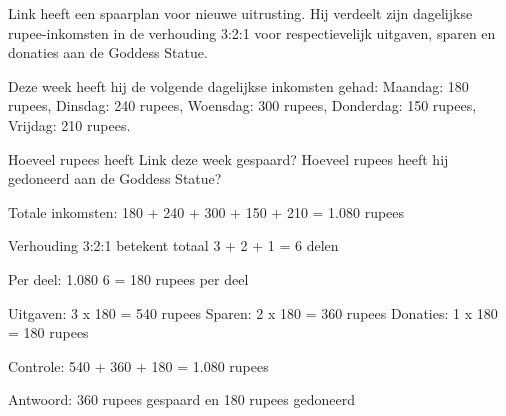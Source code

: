 \begin{opgave}
Link heeft een spaarplan voor nieuwe uitrusting. Hij verdeelt zijn dagelijkse
rupee-inkomsten in de verhouding 3:2:1 voor respectievelijk uitgaven, sparen
en donaties aan de Goddess Statue.

Deze week heeft hij de volgende dagelijkse inkomsten gehad:
Maandag: 180 rupees, Dinsdag: 240 rupees, Woensdag: 300 rupees,
Donderdag: 150 rupees, Vrijdag: 210 rupees.

Hoeveel rupees heeft Link deze week gespaard? Hoeveel rupees heeft hij
gedoneerd aan de Goddess Statue?
\end{opgave}

\begin{oplossing}
Totale inkomsten: 180 + 240 + 300 + 150 + 210 = 1.080 rupees

Verhouding 3:2:1 betekent totaal 3 + 2 + 1 = 6 delen

Per deel: 1.080 \textrm{\textdiv} 6 = 180 rupees per deel

Uitgaven: 3 x 180 = 540 rupees
Sparen: 2 x 180 = 360 rupees  
Donaties: 1 x 180 = 180 rupees

Controle: 540 + 360 + 180 = 1.080 rupees

Antwoord: 360 rupees gespaard en 180 rupees gedoneerd
\end{oplossing}